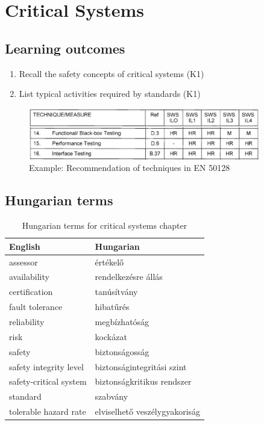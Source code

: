 \chapter{Critical Systems}


\section*{Learning outcomes}

\begin{enumerate}
    \item Recall the safety concepts of critical systems (K1)
    \item List typical activities required by standards (K1)    
\end{enumerate}


\begin{figure}[ht]
    \centering
    \includegraphics[width=0.9\textwidth]{figures/en-50128-example-recommended-techniques}
    \caption{Example: Recommendation of techniques in EN 50128}
    \label{fig:overview:en-50128-technique-recommendation}
\end{figure}

\section{Hungarian terms}

\begin{table}[ht]
    \centering
    \small
    \caption{Hungarian terms for critical systems chapter}
    \begin{tabular}{ll}
        \toprule
        \textbf{English} & \textbf{Hungarian} \\
        \midrule
        assessor & értékelő \\
        availability & rendelkezésre állás \\
        certification & tanúsítvány \\
        fault tolerance & hibatűrés \\
        reliability & megbízhatóság \\
        risk & kockázat \\
        safety & biztonságosság \\
        safety integrity level & biztonságintegritási szint \\
        safety-critical system & biztonságkritikus rendszer \\
        standard & szabvány \\
        tolerable hazard rate & elviselhető veszélygyakoriság \\
        \bottomrule
    \end{tabular}
    \label{tab:overview:hungarian-terms-critical-systems}
\end{table} 